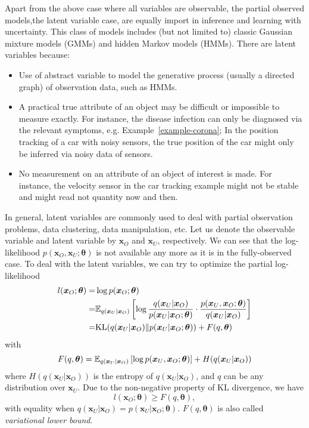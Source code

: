 Apart from the above case where all variables are observable, the partial observed models,the latent variable case, are equally import in inference and learning with uncertainty. This class of models includes (but not limited to) classic Gaussian mixture models (GMMs) and hidden Markov models (HMMs). There are latent variables because:
\begin{itemize}
\item Use of abstract variable to model the generative process (usually a directed graph) of observation data, such as HMMs.
\item A practical true attribute of an object may be difficult or impossible to measure exactly. For instance, the disease infection can only be diagnosed via the relevant symptoms, e.g. Example~\ref{example-corona}; In the position tracking of a car with noisy sensors, the true position of the car might only be inferred via noisy data of sensors.
\item No measurement on an attribute of an object of interest is made. For instance, the velocity sensor in the car tracking example might not be stable and might read not quantity now and then.
\end{itemize}
In general, latent variables are commonly used to deal with partial observation problems, data clustering, data manipulation, etc. Let us denote the observable variable and latent variable by $\bm{x}_O$ and $\bm{x}_U$, respectively. We can see that the log-likelihood $p(\bm{x}_O, \bm{x}_U; \bm{\theta})$ is not available any more as it is in the fully-observed case. To deal with the latent variables, we can try to optimize the partial log-likelihood
\begin{align}
  l(\bm{x}_O; \bm{\theta}) =& \log{p(\bm{x}_O; \bm{\theta})} \nonumber \\  
  = & \mathbb{E}_{q(\bm{x}_U|\bm{x}_O)}\left[ \log{\frac{q(\bm{x}_U|\bm{x}_O)}{p(\bm{x}_U|\bm{x}_O;\bm{\theta})} \cdot \frac{p(\bm{x}_U,\bm{x}_O;\bm{\theta})}{q(\bm{x}_U|\bm{x}_O)}} \right] \nonumber \\
      = & \mathrm{KL}(q(\bm{x}_U|\bm{x}_O)\|p(\bm{x}_U|\bm{x}_O;\bm{\theta})) + F(q, \bm{\theta})
\end{align}
with
\begin{equation}
  F(q, \bm{\theta}) = \mathbb{E}_{q(\bm{x}_U|\bm{x}_O)}\left[ \log{p(\bm{x}_U,\bm{x}_O;\bm{\theta})} \right] + H(q(\bm{x}_U|\bm{x}_O))
\end{equation}
where $H(q(\bm{x}_U|\bm{x}_O))$ is the entropy of $q(\bm{x}_U|\bm{x}_O)$, and $q$ can be any distribution over $\bm{x}_U$. Due to the non-negative property of KL divergence, we have
\begin{equation}
  l(\bm{x}_O; \bm{\theta}) \geq F(q, \bm{\theta}),
\end{equation}
with equality when $q(\bm{x}_U|\bm{x}_O) = p(\bm{x}_U|\bm{x}_O; \bm{\theta})$. $F(q, \bm{\theta})$ is also called \textit{variational lower bound}.

